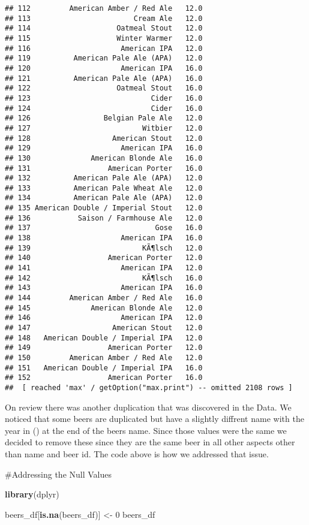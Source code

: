 \documentclass[
]{article}
\newenvironment{Shaded}{\begin{snugshade}}{\end{snugshade}}
\newcommand{\DecValTok}[1]{\textcolor[rgb]{0.00,0.00,0.81}{#1}}
\newcommand{\KeywordTok}[1]{\textcolor[rgb]{0.13,0.29,0.53}{\textbf{#1}}}
\newcommand{\NormalTok}[1]{#1}
\newcommand{\StringTok}[1]{\textcolor[rgb]{0.31,0.60,0.02}{#1}}
\begin{document}
\begin{verbatim}
## 112         American Amber / Red Ale   12.0
## 113                        Cream Ale   12.0
## 114                    Oatmeal Stout   12.0
## 115                    Winter Warmer   12.0
## 116                     American IPA   12.0
## 119          American Pale Ale (APA)   12.0
## 120                     American IPA   16.0
## 121          American Pale Ale (APA)   16.0
## 122                    Oatmeal Stout   16.0
## 123                            Cider   16.0
## 124                            Cider   16.0
## 126                 Belgian Pale Ale   12.0
## 127                          Witbier   12.0
## 128                   American Stout   12.0
## 129                     American IPA   16.0
## 130              American Blonde Ale   16.0
## 131                  American Porter   16.0
## 132          American Pale Ale (APA)   12.0
## 133          American Pale Wheat Ale   12.0
## 134          American Pale Ale (APA)   12.0
## 135 American Double / Imperial Stout   12.0
## 136           Saison / Farmhouse Ale   12.0
## 137                             Gose   16.0
## 138                     American IPA   16.0
## 139                          KÃ¶lsch   12.0
## 140                  American Porter   12.0
## 141                     American IPA   12.0
## 142                          KÃ¶lsch   16.0
## 143                     American IPA   16.0
## 144         American Amber / Red Ale   16.0
## 145              American Blonde Ale   12.0
## 146                     American IPA   12.0
## 147                   American Stout   12.0
## 148   American Double / Imperial IPA   12.0
## 149                  American Porter   12.0
## 150         American Amber / Red Ale   12.0
## 151   American Double / Imperial IPA   16.0
## 152                  American Porter   16.0
##  [ reached 'max' / getOption("max.print") -- omitted 2108 rows ]
\end{verbatim}

On review there was another duplication that was discovered in the Data.
We noticed that some beers are duplicated but have a slightly diffrent
name with the year in () at the end of the beers name. Since those
values were the same we decided to remove these since they are the same
beer in all other aspects other than name and beer id. The code above is
how we addressed that issue.

\#Addressing the Null Values

\begin{Shaded}
\begin{Highlighting}[]
\KeywordTok{library}\NormalTok{(dplyr)}

\NormalTok{beers_df[}\KeywordTok{is.na}\NormalTok{(beers_df)] <-}\StringTok{ }\DecValTok{0}
\NormalTok{beers_df}
\end{Highlighting}
\end{Shaded}
\end{document}
